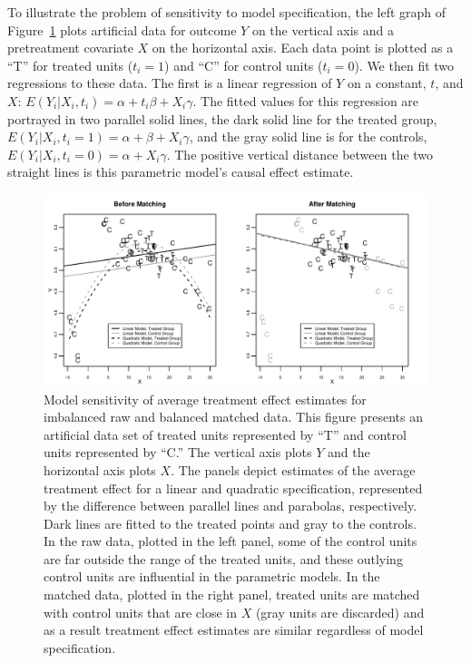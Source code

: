 \documentclass[11pt,titlepage]{article}
\begin{document}
To illustrate the problem of sensitivity to model specification, the
left graph of Figure~\ref{fg:extrap} plots artificial data for outcome
$Y$ on the vertical axis and a pretreatment covariate $X$ on the
horizontal axis.  Each data point is plotted as a ``T'' for treated
units ($t_i=1$) and ``C'' for control units ($t_i=0$).  We then fit
two regressions to these data.  The first is a linear regression of
$Y$ on a constant, $t$, and $X$: $E(Y_i|X_i,t_i)=\alpha + t_i\beta +
X_i\gamma$.  The fitted values for this regression are portrayed in
two parallel solid lines, the dark solid line for the treated group,
$E(Y_i|X_i,t_i=1)=\alpha+\beta+X_i\gamma$, and the gray solid line is
for the controls, $E(Y_i|X_i,t_i=0)=\alpha+X_i\gamma$. The positive
vertical distance between the two straight lines is this parametric
model's causal effect estimate.
\begin{figure}[t] 
 \begin{center}
   \includegraphics[width=6in]{figs/olspanel-thick.pdf}
  \end{center}
  \vspace{-0.275in}
  \caption{Model sensitivity of average treatment effect estimates for
    imbalanced raw and balanced matched data.  This figure presents an
    artificial data set of treated units represented by ``T'' and
    control units represented by ``C.'' The vertical axis plots $Y$
    and the horizontal axis plots $X$.  The panels depict estimates of
    the average treatment effect for a linear and quadratic
    specification, represented by the difference between parallel
    lines and parabolas, respectively.  Dark lines are fitted to the
    treated points and gray to the controls.  In the raw data, plotted
    in the left panel, some of the control units are far outside the
    range of the treated units, and these outlying control units are
    influential in the parametric models.  In the matched data,
    plotted in the right panel, treated units are matched with control
    units that are close in $X$ (gray units are discarded) and as a
    result treatment effect estimates are similar regardless of model
    specification.}
  \label{fg:extrap}
\end{figure}
\end{document}
